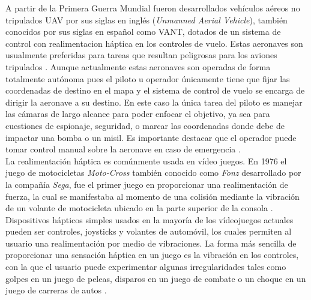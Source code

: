 A partir de la Primera Guerra Mundial fueron desarrollados  vehículos aéreos no tripulados UAV por sus siglas en inglés (\textsl{Unmanned Aerial Vehicle}), también conocidos por sus siglas en español como VANT, dotados de un sistema de control con realimentacion háptica en los controles de vuelo. Estas aeronaves son usualmente preferidas para tareas que resultan peligrosas para los aviones tripulados \cite{chandler2000uav}. Aunque actualmente estas aeronaves son operadas de forma totalmente autónoma pues el piloto u operador únicamente tiene que fijar las coordenadas de destino en el mapa y el sistema de control de vuelo se encarga de dirigir la aeronave a su destino. En este caso la única tarea del piloto es manejar las cámaras de largo alcance para poder enfocar el objetivo, ya sea para cuestiones de espionaje, seguridad, o marcar las coordenadas donde debe de impactar una bomba o un misil. Es importante destacar que el operador puede tomar control manual sobre la aeronave en caso de emergencia \cite{nikolos2003evolutionary}.\\



La realimentación háptica es comúnmente usada en vídeo juegos. En 1976 el juego de motocicletas \textsl{Moto-Cross}  también conocido como \textsl{Fonz} desarrollado por la compañía \textsl{Sega\textregistered}, fue el primer juego en proporcionar una realimentación de fuerza, la cual se manifestaba al momento de una colisión mediante la vibración de un volante de motocicleta ubicado en la parte superior de la consola \cite{wolf2008video}. Dispositivos hápticos simples usados en la mayoría de los vídeojuegos actuales pueden ser controles, joysticks y volantes de automóvil, los cuales permiten al usuario una realimentación por medio de vibraciones.  La forma más sencilla de proporcionar una sensación háptica en un juego es la vibración en los controles, con la que el usuario puede experimentar algunas irregularidades tales como golpes en un juego de peleas, disparos en un juego de combate o un choque en un juego de carreras de autos \cite{chang2002haptics}.\\



